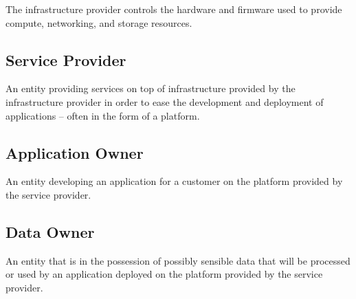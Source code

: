 The infrastructure provider controls the hardware and firmware used to provide
compute, networking, and storage resources.

\subsection*{Service Provider}

An entity providing services on top of infrastructure provided by the
infrastructure provider in order to ease the development and deployment of
applications -- often in the form of a platform.

\subsection*{Application Owner}

An entity developing an application for a customer on the platform provided by
the service provider.

\subsection*{Data Owner}


An entity that is in the possession of possibly sensible data that will be
processed or used by an application deployed on the platform provided by the
service provider.
